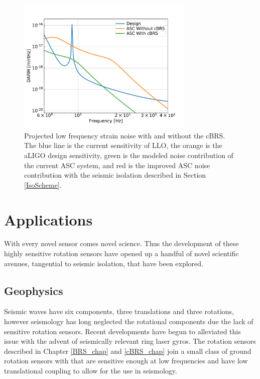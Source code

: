 \documentclass [12pt, proquest]{uwthesis}[2019]
\begin{document}
\begin{figure}[!h]
\begin{center}
\includegraphics[width=0.75\textwidth]{cBRS_ASC.pdf}
\caption[Projected low frequency strain noise with and without the cBRS]{Projected low frequency strain noise with and without the cBRS. The blue line is the current sensitivity of LLO, the orange is the aLIGO design sensitivity, green is the modeled noise contribution of the current ASC system, and red is the improved ASC noise contribution with the seismic isolation described in Section \ref{IsoScheme}. }
\label{ascStrain}
\end{center}
\end{figure}

\chapter{Applications}
\quad With every novel sensor comes novel science. Thus the development of these highly sensitive rotation sensors have opened up a handful of novel scientific avenues, tangential to seismic isolation, that have been explored.

\section{Geophysics}
Seismic waves have six components, three translations and three rotations, however seismology has long neglected the rotational components due the lack of sensitive rotation sensors. Recent developments have begun to alleviated this issue with the advent of seismically relevant ring laser gyros. \cite{ring} The rotation sensors described in Chapter \ref{BRS_chap} and \ref{cBRS_chap} join a small class of ground rotation sensors with that are sensitive enough at low frequencies and have low translational coupling to allow for the use in seismology.
\end{document}
